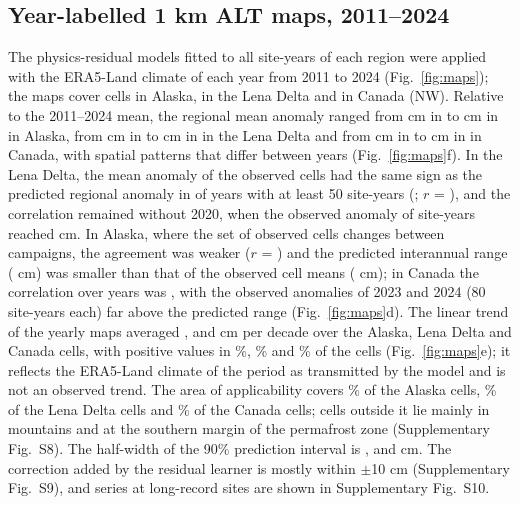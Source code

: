 \subsection{Year-labelled 1 km ALT maps, 2011--2024}
The physics-residual models fitted to all site-years of each region were applied with the ERA5-Land climate of each year from 2011 to 2024 (Fig.~\ref{fig:maps}); the maps cover \nncellmapAk{} cells in Alaska, \nncellmapLe{} in the Lena Delta and \nncellmapCa{} in Canada (NW). Relative to the 2011--2024 mean, the regional mean anomaly ranged from \nanminAk{} cm in \nanminyrAk{} to \nanmaxAk{} cm in \nanmaxyrAk{} in Alaska, from \nanminLe{} cm in \nanminyrLe{} to \nanmaxLe{} cm in \nanmaxyrLe{} in the Lena Delta and from \nanminCa{} cm in \nanminyrCa{} to \nanmaxCa{} cm in \nanmaxyrCa{} in Canada, with spatial patterns that differ between years (Fig.~\ref{fig:maps}f). In the Lena Delta, the mean anomaly of the observed cells had the same sign as the predicted regional anomaly in \nanobssameLe{} of \nanobsnLe{} years with at least 50 site-years (\nanobsyrsLe; $r$ = \nanobsrLe), and the correlation remained \nanobsrLeNoTwenty{} without 2020, when the observed anomaly of \nanobsLeTwentyN{} site-years reached \nanobsLeTwentyObs{} cm. In Alaska, where the set of observed cells changes between campaigns, the agreement was weaker ($r$ = \nanobsrAk) and the predicted interannual range (\nanpredrangeAk{} cm) was smaller than that of the observed cell means (\nanobsrangeAk{} cm); in Canada the correlation over \nanobsnCa{} years was \nanobsrCa, with the observed anomalies of 2023 and 2024 (80 site-years each) far above the predicted range (Fig.~\ref{fig:maps}d). The linear trend of the yearly maps averaged \ntrendAk{}, \ntrendLe{} and \ntrendCa{} cm per decade over the Alaska, Lena Delta and Canada cells, with positive values in \ntrendposAk\%, \ntrendposLe\% and \ntrendposCa\% of the cells (Fig.~\ref{fig:maps}e); it reflects the ERA5-Land climate of the period as transmitted by the model and is not an observed trend. The area of applicability covers \naoaAk\% of the Alaska cells, \naoaLe\% of the Lena Delta cells and \naoaCa\% of the Canada cells; cells outside it lie mainly in mountains and at the southern margin of the permafrost zone (Supplementary Fig.~S8). The half-width of the 90\% prediction interval is \nhwAk{}, \nhwLe{} and \nhwCa{} cm. The correction added by the residual learner is mostly within $\pm$10 cm (Supplementary Fig.~S9), and series at long-record sites are shown in Supplementary Fig.~S10.

